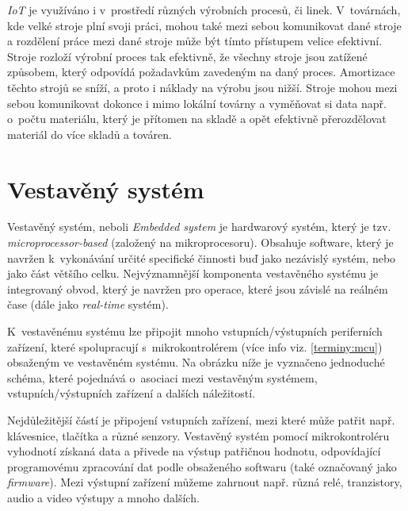 \emph{IoT} je využíváno i v~prostředí různých výrobních procesů, či linek.
V~továrnách, kde velké stroje plní svoji práci, mohou také mezi sebou komunikovat dané stroje a rozdělení práce mezi dané stroje může být tímto přístupem velice efektivní.
Stroje rozloží výrobní proces tak efektivně, že všechny stroje jsou zatížené způsobem, který odpovídá požadavkům zavedeným na daný proces.
Amortizace těchto strojů se sníží, a proto i náklady na výrobu jsou nižší.
Stroje mohou mezi sebou komunikovat dokonce i mimo lokální továrny a vyměňovat si data např. o~počtu materiálu, který je přítomen na skladě a opět efektivně přerozdělovat materiál do více skladů a továren.

\newpage

\section{Vestavěný systém}
\label{terminy:vestaveny}

Vestavěný systém, neboli \emph{Embedded system} je hardwarový systém, který je tzv. \emph{microprocessor-based} (založený na mikroprocesoru).
Obsahuje software, který je navržen k~vykonávání určité specifické činnosti buď jako nezávislý systém, nebo jako část většího celku.
Nejvýznamnější komponenta vestavěného systému je integrovaný obvod, který je navržen pro operace, které jsou závislé na reálném čase (dále jako \emph{real-time} systém).~\cite{embedded:info}

K~vestavěnému systému lze připojit mnoho vstupních/výstupních periferních zařízení, které spolupracují s~mikrokontrolérem (více info viz. \ref{terminy:mcu}) obsaženým ve vestavěném systému.
Na obrázku níže je vyznačeno jednoduché schéma, které pojednává o~asociaci mezi vestavěným systémem, vstupních/výstupních zařízení a dalších náležitostí.

Nejdůležitější částí je připojení vstupních zařízení, mezi které může patřit např. klávesnice, tlačítka a různé senzory.
Vestavěný systém pomocí mikrokontroléru vyhodnotí získaná data a přivede na výstup patřičnou hodnotu, odpovídající programovému zpracování dat podle obsaženého softwaru (také označovaný jako \emph{firmware}).
Mezi výstupní zařízení můžeme zahrnout např. různá relé, tranzistory, audio a video výstupy a mnoho dalších.

